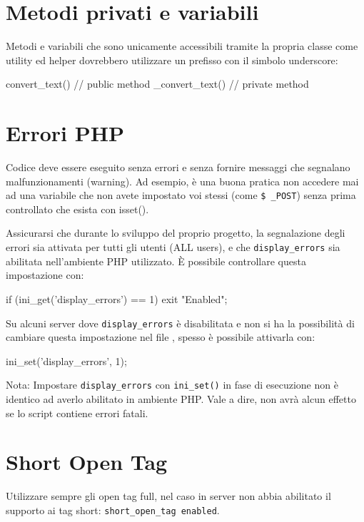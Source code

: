 
\section*{Metodi privati e variabili}
Metodi e variabili che sono unicamente accessibili tramite la propria classe come utility ed helper dovrebbero utilizzare un prefisso con il simbolo underscore:

\begin{code}
convert_text() // public method
_convert_text()	// private method
\end{code}

\section*{Errori PHP}
Codice deve essere eseguito senza errori e senza fornire messaggi che segnalano malfunzionamenti (warning). Ad esempio, è una buona pratica non accedere mai ad una variabile che non avete impostato voi stessi (come \verb|$ _POST|) senza prima controllato che esista con isset().

Assicurarsi che durante lo sviluppo del proprio progetto, la segnalazione degli errori sia attivata per tutti gli utenti (ALL users), e che \verb|display_errors| sia abilitata nell'ambiente \ac{PHP} utilizzato. È possibile controllare questa impostazione con:

\begin{code}
if (ini_get('display_errors') == 1)
{
	exit "Enabled";
}
\end{code}

Su alcuni server dove \verb|display_errors| è disabilitata e non si ha la possibilità di cambiare questa impostazione nel file , spesso è possibile attivarla con:

\begin{code}
ini_set('display_errors', 1);
\end{code}

Nota: Impostare  \verb|display_errors| con \verb|ini_set()| in fase di esecuzione non è identico ad averlo abilitato in ambiente PHP. Vale a dire, non avrà alcun effetto se lo script contiene errori fatali.

\section*{Short Open Tag}
Utilizzare sempre gli open tag full, nel caso in server non abbia abilitato il supporto ai tag short: \verb|short_open_tag enabled|.

